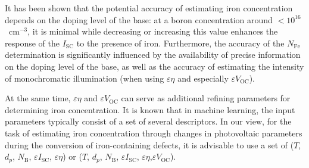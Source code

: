 \documentclass[a4paper,fleqn]{cas-sc}
\begin{document}
It has been shown that the potential accuracy of estimating iron concentration depends on the doping level of the base: at a boron concentration around $<10^{16}$~cm$^{-3}$, it is minimal while decreasing or increasing this value enhances the response of the $I_\mathrm{SC}$ to the presence of iron. Furthermore, the accuracy of the $N_\mathrm{Fe}$ determination is significantly influenced by the availability of precise information on the doping level of the base, as well as the accuracy of estimating the intensity of monochromatic illumination (when using $\varepsilon \eta$ and especially $\varepsilon V_\mathrm{OC}$).

At the same time, $\varepsilon \eta$ and $\varepsilon V_\mathrm{OC}$ can serve as additional refining parameters for determining iron concentration. It is known that in machine learning, the input parameters typically consist of a set of several descriptors. In our view, for the task of estimating iron concentration through changes in photovoltaic parameters during the conversion of iron-containing defects, it is advisable to use a set of ($T$, $d_p$, $N_\mathrm{B}$, $\varepsilon I_\mathrm{SC}$, $\varepsilon \eta$) or ($T$, $d_p$, $N_\mathrm{B}$, $\varepsilon I_\mathrm{SC}$, $\varepsilon \eta$,$\varepsilon V_\mathrm{OC}$).





\end{document}
